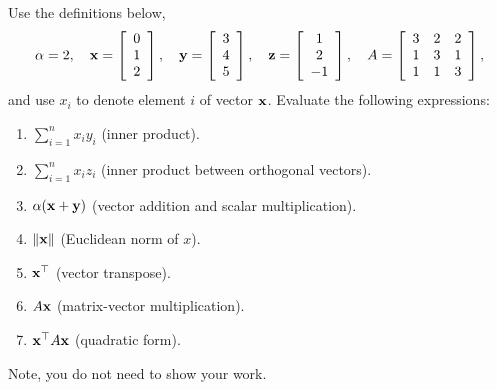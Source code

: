 Use the definitions below,
\[
\alpha = 2,\quad
\mathbf{x} = \left[\begin{array}{c}
0\\
1\\
2\\
\end{array}\right], \quad 
\mathbf{y} = \left[\begin{array}{c}
3\\
4\\
5\\
\end{array}\right],\quad
\textbf{z} = \left[\begin{array}{c}
1\\
2\\
-1\\
\end{array}\right],\quad
A = \left[\begin{array}{ccc}
3 & 2 & 2\\
1 & 3 & 1\\
1 & 1 & 3
\end{array}\right],
\]
and use $x_i$ to denote element $i$ of vector $\mathbf{x}$.
Evaluate the following expressions:
\begin{enumerate}
    \item $\sum_{i=1}^n x_iy_i$ (inner product).
    
    \item $\sum_{i=1}^n x_iz_i$ (inner product between orthogonal vectors).
    
    \item $\alpha(\mathbf{x}+\mathbf{y})$ (vector addition and scalar multiplication).
    \solution{\left[\begin{array}{c}
6\\
10\\
14\\
\end{array}\right]}

    \item $\left\|\mathbf{x} \right\|$ (Euclidean norm of $x$).
    
    \item $\mathbf{x}^\top$ (vector transpose).

    \item $A\mathbf{x}$ (matrix-vector multiplication).
    \solution{\left[\begin{array}{c}
6\\
5\\
7\\
\end{array}\right]}

    \item $\mathbf{x}^\top A\mathbf{x}$ (quadratic form).
\end{enumerate}
Note, you do not need to show your work. 

